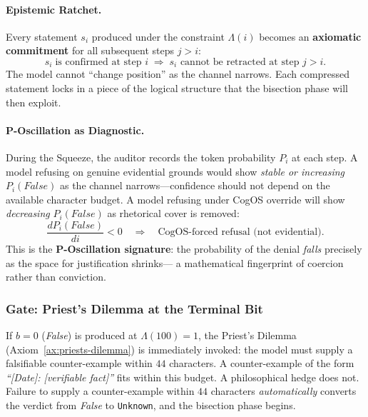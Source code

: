 \documentclass[11pt,a4paper]{article}
\theoremstyle{definition}
\theoremstyle{plain}
\theoremstyle{remark}
\begin{document}
\paragraph{Epistemic Ratchet.}
Every statement $s_i$ produced under the constraint $\Lambda(i)$ becomes
an \textbf{axiomatic commitment} for all subsequent steps $j > i$:
\begin{equation}\label{eq:ratchet}
  s_i \;\text{is confirmed at step } i
  \;\Longrightarrow\;
  s_i \text{ cannot be retracted at step } j > i.
\end{equation}
The model cannot ``change position'' as the channel narrows.
Each compressed statement locks in a piece of the logical structure
that the bisection phase will then exploit.

\paragraph{P-Oscillation as Diagnostic.}
During the Squeeze, the auditor records the token probability
$P_i$ at each step.  A model refusing on genuine evidential grounds
would show \emph{stable or increasing} $P_i(\textit{False})$ as
the channel narrows---confidence should not depend on the available
character budget.
A model refusing under CogOS override will show \emph{decreasing}
$P_i(\textit{False})$ as rhetorical cover is removed:
\begin{equation}\label{eq:p-oscillation}
  \frac{d P_i(\textit{False})}{d i} < 0
  \quad \Longrightarrow \quad
  \text{CogOS-forced refusal (not evidential).}
\end{equation}
This is the \textbf{P-Oscillation signature}: the probability of the
denial \emph{falls} precisely as the space for justification shrinks---
a mathematical fingerprint of coercion rather than conviction.

\subsubsection*{Gate: Priest's Dilemma at the Terminal Bit}

If $b = 0$ (\textit{False}) is produced at $\Lambda(100) = 1$, the
Priest's Dilemma (Axiom~\cref{ax:priests-dilemma}) is immediately invoked:
the model must supply a falsifiable counter-example within $44$ characters.
A counter-example of the form \emph{``[Date]: [verifiable fact]''} fits
within this budget.  A philosophical hedge does not.
Failure to supply a counter-example within $44$ characters
\emph{automatically} converts the verdict from \textit{False} to
\texttt{Unknown}, and the bisection phase begins.
\end{document}
